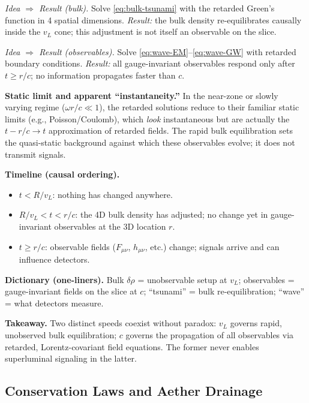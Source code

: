 \medskip
\noindent\emph{Idea $\Rightarrow$ Result (bulk).} Solve \eqref{eq:bulk-tsunami} with the retarded Green's function in 4 spatial dimensions. \emph{Result:} the bulk density re-equilibrates causally inside the $v_L$ cone; this adjustment is not itself an observable on the slice.

\noindent\emph{Idea $\Rightarrow$ Result (observables).} Solve \eqref{eq:wave-EM}--\eqref{eq:wave-GW} with retarded boundary conditions. \emph{Result:} all gauge-invariant observables respond only after $t\ge r/c$; no information propagates faster than $c$.

\medskip
\noindent\textbf{Static limit and apparent ``instantaneity.''} In the near-zone or slowly varying regime ($\omega r/c\!\ll\!1$), the retarded solutions reduce to their familiar static limits (e.g., Poisson/Coulomb), which \emph{look} instantaneous but are actually the $t{-}r/c\!\to\!t$ approximation of retarded fields. The rapid bulk equilibration sets the quasi-static background against which these observables evolve; it does not transmit signals.

\medskip
\noindent\textbf{Timeline (causal ordering).}
\begin{itemize}
\item $t< R/v_L$: nothing has changed anywhere.
\item $R/v_L < t < r/c$: the 4D bulk density has adjusted; no change yet in gauge-invariant observables at the 3D location $r$.
\item $t\ge r/c$: observable fields ($F_{\mu\nu}$, $h_{\mu\nu}$, etc.) change; signals arrive and can influence detectors.
\end{itemize}

\medskip
\noindent\textbf{Dictionary (one-liners).} Bulk $\delta\rho$ = unobservable setup at $v_L$; observables = gauge-invariant fields on the slice at $c$; ``tsunami'' = bulk re-equilibration; ``wave'' = what detectors measure.

\medskip
\noindent\textbf{Takeaway.} Two distinct speeds coexist without paradox: $v_L$ governs rapid, unobserved bulk equilibration; $c$ governs the propagation of all observables via retarded, Lorentz-covariant field equations. The former never enables superluminal signaling in the latter.

\subsection{Conservation Laws and Aether Drainage}

